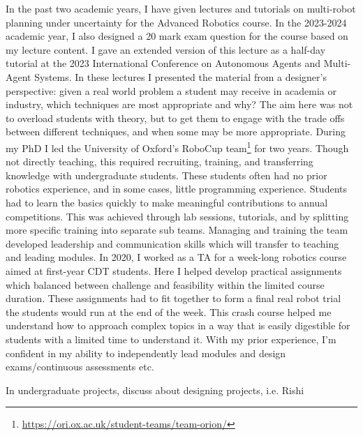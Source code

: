 \documentclass[12pt]{article}
\begin{document}
In the past two academic years, I have given lectures and tutorials on multi-robot planning under uncertainty for the Advanced Robotics course.
%
In the 2023-2024 academic year, I also designed a 20 mark exam question for the course based on my lecture content.
%
I gave an extended version of this lecture as a half-day tutorial at the 2023 International Conference on Autonomous Agents and Multi-Agent Systems.
%
In these lectures I presented the material from a designer's perspective: given a real world problem a student may receive in academia or industry, which techniques are most appropriate and why?
%
The aim here was not to overload students with theory, but to get them to engage with the trade offs between different techniques, and when some may be more appropriate.
%
During my PhD I led the University of Oxford's RoboCup team\footnote{\url{https://ori.ox.ac.uk/student-teams/team-orion/}} for two years.
%
Though not directly teaching, this required recruiting, training, and transferring knowledge with undergraduate students.
%
These students often had no prior robotics experience, and in some cases, little programming experience.
%
Students had to learn the basics quickly to make meaningful contributions to annual competitions.
%
This was achieved through lab sessions, tutorials, and by splitting more specific training into separate sub teams.
%
Managing and training the team developed leadership and communication skills which will transfer to teaching and leading modules.
%
In 2020, I worked as a TA for a week-long robotics course aimed at first-year CDT students.
%
Here I helped develop practical assignments which balanced between challenge and feasibility within the limited course duration.
%
These assignments had to fit together to form a final real robot trial the students would run at the end of the week.
%
This crash course helped me understand how to approach complex topics in a way that is easily digestible for students with a limited time to understand it.
%
With my prior experience, I'm confident in my ability to independently lead modules and design exams/continuous assessments etc.

In undergraduate projects, discuss about designing projects, i.e. Rishi
\end{document}
